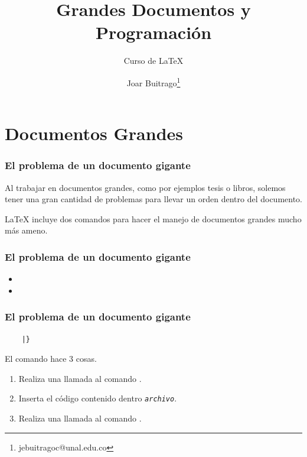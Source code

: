 \documentclass[12pt,aspectratio=169,ignorenonframetext]{ltxbeamer}
\title{Grandes Documentos y Programación}
\subtitle{Curso de {\lmr\LaTeX}}
\author{Joar Buitrago\texorpdfstring{\thanks{jebuitragoc@unal.edu.co}}{ <jebuitragoc@unal.edu.co>}}
\date{}
\begin{document}
\begin{frame}
\titlepage
\end{frame}





\section{Documentos Grandes}

\begin{frame}
\frametitle{El problema de un documento gigante}

Al trabajar en documentos grandes, como por ejemplos tesis o libros, solemos tener una gran cantidad de problemas para llevar un orden dentro del documento.

{\lmr\LaTeX} incluye dos comandos para hacer el manejo de documentos grandes mucho más ameno.
\end{frame}





\begin{frame}[fragile]
\frametitle{El problema de un documento gigante}

\begin{itemize}
    \item \texttt{}
    \item \texttt{}
\end{itemize}
\end{frame}





\begin{frame}[fragile]
\frametitle{El problema de un documento gigante}

\begin{verbatim}
    |}
\end{verbatim}

\pause

El comando \texttt{} hace 3 cosas.

\begin{enumerate}
    \item Realiza una llamada al comando \texttt{\clearpage}.
    \item Inserta el código contenido dentro \texttt{\textit{archivo}}.
    \item Realiza una llamada al comando \texttt{\clearpage}.
\end{enumerate}
\end{frame}
\end{document}
